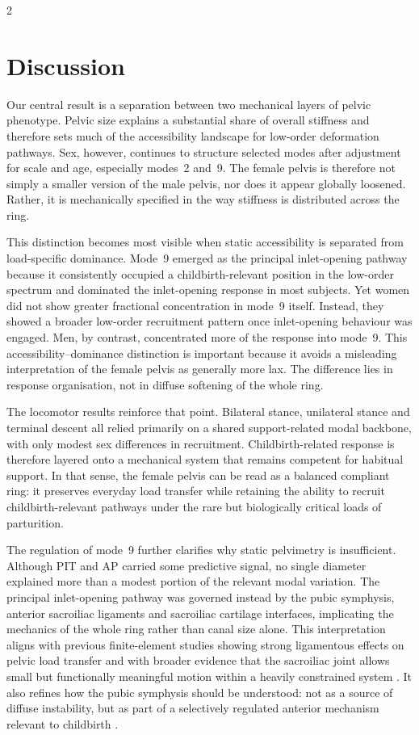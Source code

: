 \documentclass[openacc]{rsproca_new}
\begin{document}
\begin{multicols}{2}
\section{Discussion}

Our central result is a separation between two mechanical layers of pelvic phenotype. Pelvic size explains a substantial share of overall stiffness and therefore sets much of the accessibility landscape for low-order deformation pathways. Sex, however, continues to structure selected modes after adjustment for scale and age, especially modes~2 and~9. The female pelvis is therefore not simply a smaller version of the male pelvis, nor does it appear globally loosened. Rather, it is mechanically specified in the way stiffness is distributed across the ring.

This distinction becomes most visible when static accessibility is separated from load-specific dominance. Mode~9 emerged as the principal inlet-opening pathway because it consistently occupied a childbirth-relevant position in the low-order spectrum and dominated the inlet-opening response in most subjects. Yet women did not show greater fractional concentration in mode~9 itself. Instead, they showed a broader low-order recruitment pattern once inlet-opening behaviour was engaged. Men, by contrast, concentrated more of the response into mode~9. This accessibility--dominance distinction is important because it avoids a misleading interpretation of the female pelvis as generally more lax. The difference lies in response organisation, not in diffuse softening of the whole ring.

The locomotor results reinforce that point. Bilateral stance, unilateral stance and terminal descent all relied primarily on a shared support-related modal backbone, with only modest sex differences in recruitment. Childbirth-related response is therefore layered onto a mechanical system that remains competent for habitual support. In that sense, the female pelvis can be read as a balanced compliant ring: it preserves everyday load transfer while retaining the ability to recruit childbirth-relevant pathways under the rare but biologically critical loads of parturition.

The regulation of mode~9 further clarifies why static pelvimetry is insufficient. Although PIT and AP carried some predictive signal, no single diameter explained more than a modest portion of the relevant modal variation. The principal inlet-opening pathway was governed instead by the pubic symphysis, anterior sacroiliac ligaments and sacroiliac cartilage interfaces, implicating the mechanics of the whole ring rather than canal size alone. This interpretation aligns with previous finite-element studies showing strong ligamentous effects on pelvic load transfer \cite{Eichenseer2011,Hammer2013} and with broader evidence that the sacroiliac joint allows small but functionally meaningful motion within a heavily constrained system \cite{Vleeming2012,Kiapour2019,ChoKwak2020}. It also refines how the pubic symphysis should be understood: not as a source of diffuse instability, but as part of a selectively regulated anterior mechanism relevant to childbirth \cite{Grunstra2019,Stolarczyk2021}.


\end{multicols}
\end{document}
